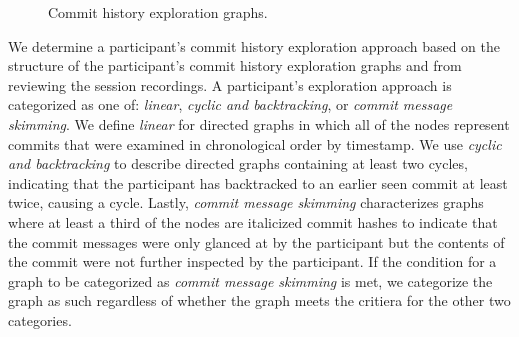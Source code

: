 \begin{figure}
  \centering%
  \qquad
  \caption{
    Commit history exploration graphs.
  }%
  \label{fig:Exploration-Graphs}%
\end{figure}

We determine a participant's commit history exploration approach based on the structure 
of the participant's commit history exploration graphs and from reviewing the session recordings.
A participant's exploration approach is categorized as one of:
\textit{linear}, \textit{cyclic and backtracking}, or \textit{commit message skimming}.
We define \textit{linear} for directed graphs in which all of the nodes represent commits 
that were examined in chronological order by timestamp. 
We use \textit{cyclic and backtracking} to describe directed graphs 
containing at least two cycles, indicating that the participant has backtracked to
an earlier seen commit at least twice, causing a cycle. 
Lastly, \textit{commit message skimming} characterizes graphs where 
at least a third of the nodes are italicized commit hashes to indicate
that the commit messages were only glanced at by the participant but the
contents of the commit were not further inspected by the participant.
If the condition for a graph to be categorized as \textit{commit message skimming} is met,
we categorize the graph as such regardless of whether the graph meets the critiera for the other two categories.

